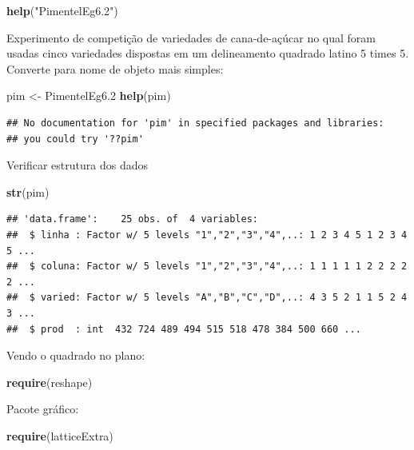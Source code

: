 \documentclass[
]{book}
\newenvironment{Shaded}{\begin{snugshade}}{\end{snugshade}}
\newcommand{\FloatTok}[1]{\textcolor[rgb]{0.00,0.00,0.81}{#1}}
\newcommand{\KeywordTok}[1]{\textcolor[rgb]{0.13,0.29,0.53}{\textbf{#1}}}
\newcommand{\NormalTok}[1]{#1}
\newcommand{\StringTok}[1]{\textcolor[rgb]{0.31,0.60,0.02}{#1}}
\begin{document}
\begin{Shaded}
\begin{Highlighting}[]
\KeywordTok{help}\NormalTok{(}\StringTok{"PimentelEg6.2"}\NormalTok{)}
\end{Highlighting}
\end{Shaded}

Experimento de competição de variedades de cana-de-açúcar no qual foram usadas cinco variedades dispostas em um delineamento quadrado latino 5 times 5. Converte para nome de objeto mais simples:

\begin{Shaded}
\begin{Highlighting}[]
\NormalTok{pim <-}\StringTok{ }\NormalTok{PimentelEg6}\FloatTok{.2} 
\KeywordTok{help}\NormalTok{(pim)}
\end{Highlighting}
\end{Shaded}

\begin{verbatim}
## No documentation for 'pim' in specified packages and libraries:
## you could try '??pim'
\end{verbatim}

Verificar estrutura dos dados

\begin{Shaded}
\begin{Highlighting}[]
\KeywordTok{str}\NormalTok{(pim)}
\end{Highlighting}
\end{Shaded}

\begin{verbatim}
## 'data.frame':    25 obs. of  4 variables:
##  $ linha : Factor w/ 5 levels "1","2","3","4",..: 1 2 3 4 5 1 2 3 4 5 ...
##  $ coluna: Factor w/ 5 levels "1","2","3","4",..: 1 1 1 1 1 2 2 2 2 2 ...
##  $ varied: Factor w/ 5 levels "A","B","C","D",..: 4 3 5 2 1 1 5 2 4 3 ...
##  $ prod  : int  432 724 489 494 515 518 478 384 500 660 ...
\end{verbatim}

Vendo o quadrado no plano:

\begin{Shaded}
\begin{Highlighting}[]
\KeywordTok{require}\NormalTok{(reshape)}
\end{Highlighting}
\end{Shaded}

Pacote gráfico:

\begin{Shaded}
\begin{Highlighting}[]
\KeywordTok{require}\NormalTok{(latticeExtra)}
\end{Highlighting}
\end{Shaded}
\end{document}

